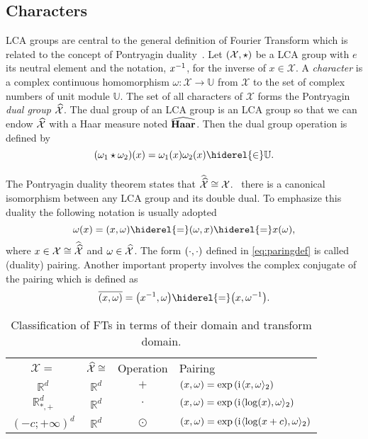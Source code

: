 \subsection{Characters}
\label{subsec:character}
\acf{LCA} groups are central to the general definition of Fourier Transform which is related to the concept of Pontryagin duality~\citep{folland1994course}.
Let $(\mathcal{X}, \star)$ be a \ac{LCA} group with $e$ its neutral element and the notation, ${x}^{-1}$, for the inverse of $x \in \mathcal{X}$. A \emph{character} is a complex continuous homomorphism $\omega:\mathcal{X}\to\mathbb{U}$ from $\mathcal{X}$ to the set of complex numbers of unit module $\mathbb{U}$. The set of all characters of $\mathcal{X}$ forms the Pontryagin \emph{dual  group} $\widehat{\mathcal{X}}$. The dual group of an \ac{LCA} group is an \ac{LCA} group so that we can endow $\widehat{\mathcal{X}}$ with a  Haar measure noted $\widehat{\mathbf{Haar}}$. Then the dual group operation is defined by
\begin{dmath*}
(\omega_1 \groupop \omega_2)(x)=\omega_1(x)\omega_2(x) \hiderel{\in} \mathbb{U}.
\end{dmath*}
\paragraph{}
The Pontryagin duality theorem states that $\widehat{\widehat{\mathcal{X}}}\cong \mathcal{X}$. \Ie~there is a canonical isomorphism between any \ac{LCA} group and its double dual. To emphasize this duality the following notation is usually adopted
\begin{dmath}
\label{eq:paringdef}
\omega(x)=\pairing{x,\omega}\hiderel{=}\pairing{\omega,x}\hiderel{=}x(\omega),
\end{dmath}
where $x\in\mathcal{X}\cong\widehat{\widehat{\mathcal{X}}}$ and $\omega\in\widehat{\mathcal{X}}$. The form $(\cdot,\cdot)$ defined in \cref{eq:paringdef} is called (duality) pairing. Another important property involves the complex conjugate of the pairing which is defined as
\begin{dmath}
\conj{\pairing{x,\omega}} = \pairing*{\inv{x},\omega}\hiderel{=}\pairing*{x,\inv{\omega}}.
\end{dmath}
\begin{table}[htb]
\caption{Classification of \acl{FT}s in terms of their domain and transform domain.}
\label{tab:dual_and_pairing}
\centering
\begin{tabularx}{\textwidth}{cccX}
\toprule
\multicolumn{1}{c}{$\mathcal{X}=$} & \multicolumn{1}{c}{$\widehat{\mathcal{X}}\cong$} & \multicolumn{1}{c}{Operation} & \multicolumn{1}{l}{Pairing} \\
\cmidrule{1-4}
$\mathbb{R}^d$ & $\mathbb{R}^d$ & $+$ & $(x,\omega) = \exp\left({\mathrm{i}\mkern1mu} \langle x, \omega\rangle_2\right)$ \\
$\mathbb{R}^d_{*,+}$ & $\mathbb{R}^d$ & $\cdot$ & $(x,\omega) =\exp\left( {\mathrm{i}\mkern1mu} \langle\log(x), \omega\rangle_2 \right)$ \\
$(-c;+\infty)^d$ & $\mathbb{R}^d$ & $\odot$ & $(x,\omega) =\exp\left( {\mathrm{i}\mkern1mu} \langle\log(x+c), \omega\rangle_2 \right)$ \\
\bottomrule
\end{tabularx}
\end{table}
